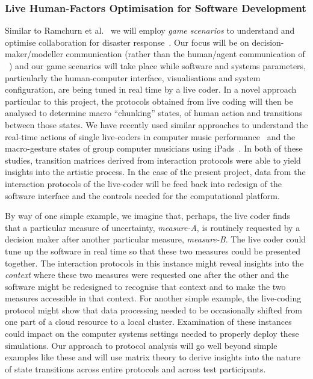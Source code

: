 \subsubsection*{ Live Human-Factors Optimisation for Software Development}




Similar to Ramchurn et al.~\parencite{ramchurn2016human} 
we will employ {\em game
scenarios} to understand and optimise collaboration for disaster
response~\parencite{ramchurn2016human}. Our focus will be on
decision-maker/modeller communication (rather than the human/agent
communication of ~\parencite{ramchurn2016human}) and our game scenarios 
will take place while software
and systems parameters, particularly the human-computer interface,
visualisations and system configuration, are being tuned in real time
by a live coder. In a novel approach particular to this project, the protocols obtained from
live coding will then be analysed to determine macro ``chunking''
states, of human action and transitions between those states. We have
recently used similar approaches to understand the real-time actions
of single live-coders in computer music
performance~\parencite{swift2014coding} and the macro-gesture states
of group computer musicians using
iPads~\parencite{martin2015tracking}. In both of these studies,
transition matrices derived from interaction protocols were able to
yield insights into the artistic process. In the case of the present
project, data from the interaction protocols of the live-coder will be
feed back into redesign of the software interface and the controls
needed for the computational platform.

By way of one simple example, we imagine that, perhaps, the live coder
finds that a particular measure of uncertainty, \emph{measure-A}, is
routinely requested by a decision maker after another particular
measure, \emph{measure-B}. The live coder could tune up the software
in real time so that these two measures could be presented together.
The interaction protocols in this instance might reveal insights into
the \emph{context} where these two measures were requested one after
the other and the software might be redesigned to recognise that
context and to make the two measures accessible in that context. For
another simple example, the live-coding protocol might show that data
processing needed to be occasionally shifted from one part of a cloud
resource to a local cluster. Examination of these instances could
impact on the computer systems settings needed to properly deploy
these simulations. Our approach to protocol analysis will go well
beyond simple examples like these and will use matrix theory to derive
insights into the nature of state transitions across entire protocols
and across test participants.

